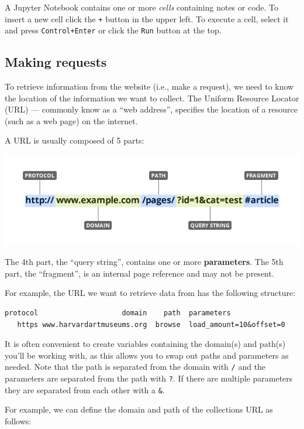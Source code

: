 \documentclass[
]{book}
\begin{document}
A Jupyter Notebook contains one or more \emph{cells} containing notes or code. To insert a new cell click the \texttt{+} button in the upper left. To execute a cell, select it and press \texttt{Control+Enter} or click the \texttt{Run} button at the top.

\hypertarget{making-requests}{%
\subsection{Making requests}\label{making-requests}}

To retrieve information from the website (i.e., make a request), we need to know the location of the information we want to collect. The Uniform Resource Locator (URL) --- commonly know as a ``web address'', specifies the location of a resource (such as a web page) on the internet.

A URL is usually composed of 5 parts:

\includegraphics{Python/PythonWebScrape/images/URL.png}

The 4th part, the ``query string'', contains one or more \textbf{parameters}. The 5th part, the ``fragment'', is an internal page reference and may not be present.

For example, the URL we want to retrieve data from has the following structure:

\begin{verbatim}
protocol                    domain    path  parameters
   https www.harvardartmuseums.org  browse  load_amount=10&offset=0
\end{verbatim}

It is often convenient to create variables containing the domain(s) and path(s) you'll be working with, as this allows you to swap out paths and parameters as needed. Note that the path is separated from the domain with \texttt{/} and the parameters are separated from the path with \texttt{?}. If there are multiple parameters they are separated from each other with a \texttt{\&}.

For example, we can define the domain and path of the collections URL as follows:
\end{document}
